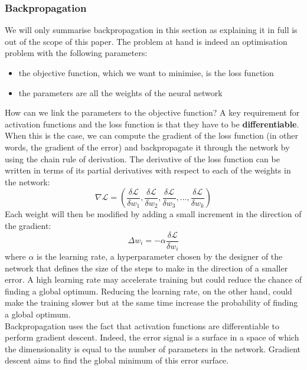 \subsubsection{Backpropagation}
We will only summarise backpropagation in this section as explaining it in
full is out of the scope of this paper.
The problem at hand is indeed an optimisation problem with the following
parameters:
\begin{itemize}
	\item the objective function, which we want to minimise, is the loss 
		function
	\item the parameters are all the weights of the neural network
\end{itemize}
How can we link the parameters to the objective function? A key requirement
for activation functions and the loss function is that they have to be
\textbf{differentiable}. When this is the case, we can compute the gradient
of the loss function (in other words, the gradient of the error) and 
backpropagate it through the network by using the
chain rule of derivation. The derivative of the loss function can be written
in terms of its partial derivatives with respect to each of the weights
in the network:
$$\nabla\mathcal{L} = \left(
  \frac{\delta\mathcal{L}}{\delta w_1}, 
  \frac{\delta\mathcal{L}}{\delta w_2}, 
  \frac{\delta\mathcal{L}}{\delta w_3}, ...,
  \frac{\delta\mathcal{L}}{\delta w_k}\right) 
$$
Each weight will then be modified by adding a small increment in the direction 
of the gradient:
$$ \Delta w_i = - \alpha \frac{\delta\mathcal{L}}{\delta w_i}$$
where $\alpha$ is the learning rate, a hyperparameter chosen by the designer
of the network that defines the size of the steps to make in the direction
of a smaller error. A high learning rate may accelerate training but could
reduce the chance of finding a global optimum. Reducing the learning rate,
on the other hand, could make the training slower but at the same time 
increase the probability of finding a global optimum.\\

Backpropagation uses the fact that activation functions are differentiable to
perform gradient descent. Indeed, the error signal is a surface in a space
of which the dimensionality is equal to the number of parameters in the
network. Gradient descent aims to find the global minimum of this error
surface.\\


